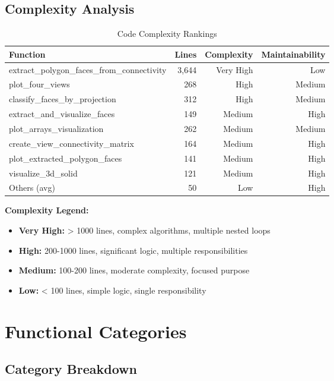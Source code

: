 \documentclass[11pt,a4paper]{article}
\begin{document}
\subsection{Complexity Analysis}

\begin{table}[htbp]
\centering
\begin{tabular}{lrrr}
\toprule
\textbf{Function} & \textbf{Lines} & \textbf{Complexity} & \textbf{Maintainability} \\
\midrule
extract\_polygon\_faces\_from\_connectivity & 3,644 & Very High & Low \\
plot\_four\_views & 268 & High & Medium \\
classify\_faces\_by\_projection & 312 & High & Medium \\
extract\_and\_visualize\_faces & 149 & Medium & High \\
plot\_arrays\_visualization & 262 & Medium & Medium \\
create\_view\_connectivity\_matrix & 164 & Medium & High \\
plot\_extracted\_polygon\_faces & 141 & Medium & High \\
visualize\_3d\_solid & 121 & Medium & High \\
Others (avg) & 50 & Low & High \\
\bottomrule
\end{tabular}
\caption{Code Complexity Rankings}
\label{tab:complexity}
\end{table}

\textbf{Complexity Legend:}
\begin{itemize}
    \item \textbf{Very High:} > 1000 lines, complex algorithms, multiple nested loops
    \item \textbf{High:} 200-1000 lines, significant logic, multiple responsibilities
    \item \textbf{Medium:} 100-200 lines, moderate complexity, focused purpose
    \item \textbf{Low:} < 100 lines, simple logic, single responsibility
\end{itemize}

\newpage
\section{Functional Categories}

\subsection{Category Breakdown}
\end{document}
